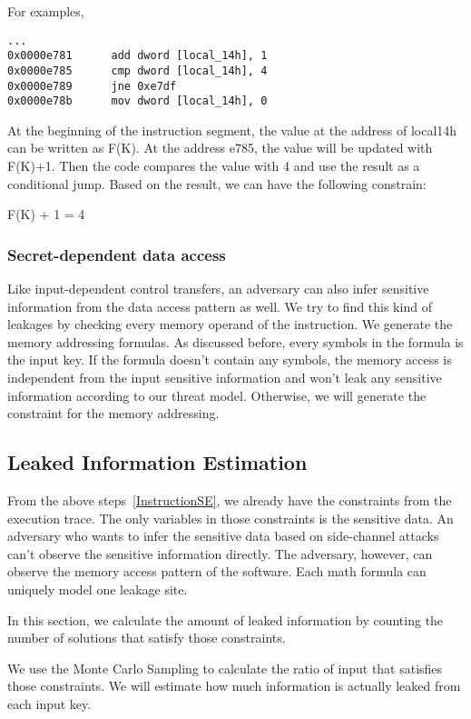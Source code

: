 For examples,

\begin{lstlisting}
...
0x0000e781      add dword [local_14h], 1
0x0000e785      cmp dword [local_14h], 4
0x0000e789      jne 0xe7df
0x0000e78b      mov dword [local_14h], 0

\end{lstlisting}

At the beginning of the instruction segment, the value at the 
address of local14h can be written as F(K). At the address e785, 
the value will be updated with F(K)+1. Then the code compares 
the value with 4 and use the result as a conditional jump. 
Based on the result, we can have the following constrain:

F(K) + 1 = 4

\subsubsection{Secret-dependent data access}
Like input-dependent control transfers, an adversary can also infer 
sensitive information from the data access pattern as well. 
We try to find this kind of leakages by checking 
every memory operand of the instruction. We generate the memory addressing 
formulas. As discussed before, every symbols in the formula is the input key. 
If the formula doesn’t contain any symbols, the memory access is independent 
from the input sensitive information and won’t leak any sensitive information 
according to our threat model. Otherwise, we will generate the constraint for
the memory addressing.

\subsection{Leaked Information Estimation}

From the above steps~\ref{InstructionSE}, we already have the constraints 
from the execution trace. 
The only variables in those constraints is the sensitive data. An adversary who 
wants to infer the sensitive data based on side-channel attacks can’t observe 
the sensitive information directly. The adversary, however, can observe the
memory access pattern of the software. Each math formula can uniquely model
one leakage site.


In this section, we calculate the amount of leaked information by counting 
the number of solutions that satisfy those constraints.

We use the Monte Carlo Sampling to calculate the ratio of input that satisfies 
those constraints. We will estimate how much information is actually leaked 
from each input key.

